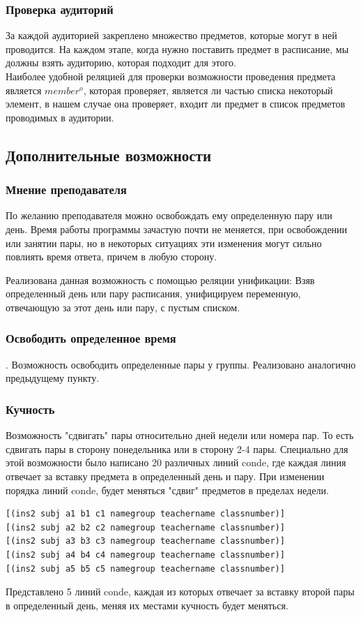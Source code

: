 \subsubsection{Проверка аудиторий}
За каждой аудиторией закреплено множество предметов, которые могут в ней проводится.
На каждом этапе, когда нужно поставить предмет в расписание, мы должны взять аудиторию, которая подходит для этого. \\
Наиболее удобной реляцией для проверки возможности проведения предмета является $member^o$, которая проверяет, является ли частью списка некоторый элемент, в нашем случае она проверяет, входит ли предмет в список предметов проводимых в аудитории.


\subsection{Дополнительные возможности}

   \subsubsection{Мнение преподавателя} По желанию преподавателя можно освобождать ему определенную пару или день. Время работы программы зачастую почти не меняется, при освобождении или занятии пары, но в некоторых ситуациях эти изменения могут сильно повлиять время ответа, причем в любую сторону.
   
   Реализована данная возможность с помощью реляции унификации: Взяв определенный день или пару расписания, унифицируем переменную, отвечающую за этот день или пару, с пустым списком.
   
   \subsubsection{Освободить определенное время}. Возможность освободить определенные пары у группы. Реализовано аналогично предыдущему пункту.
   \subsubsection{Кучность} Возможность "сдвигать" пары относительно дней недели или номера пар. То есть сдвигать пары в сторону понедельника или в сторону 2-4 пары. 
   Специально для этой возможности было написано 20 различных линий conde, где каждая линия отвечает за вставку предмета в определенный день и пару. При изменении порядка линий conde, будет меняться "сдвиг" предметов в пределах недели.
  \begin{lstlisting}[caption=Сдвиг пар, language=OCaml, frame=single]
[(ins2 subj a1 b1 c1 namegroup teachername classnumber)]
[(ins2 subj a2 b2 c2 namegroup teachername classnumber)]
[(ins2 subj a3 b3 c3 namegroup teachername classnumber)]
[(ins2 subj a4 b4 c4 namegroup teachername classnumber)]
[(ins2 subj a5 b5 c5 namegroup teachername classnumber)]
\end{lstlisting}
Представлено 5 линий conde, каждая из которых отвечает за вставку второй пары в определенный день, меняя их местами кучность будет меняться.




